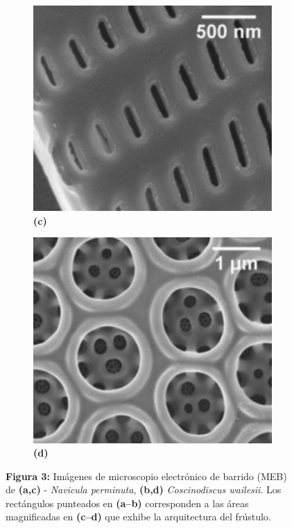 \documentclass[10pt,aspectratio=1610,compress,dvipsnames]{beamer}
\begin{document}
\begin{frame}
{\begin{figure}
  \begin{subfigure}[b]{0.2\linewidth}
    \includegraphics[width=0.9\linewidth]{Frustrulespictures/Screen Shot 2023-07-02 at 8.25.17 PM.png} %
    \caption*{\textbf{(c)}}
    \label{fig7:c}
  \end{subfigure}\hspace{0.5cm} %
  \begin{subfigure}[b]{0.2\linewidth}
    \includegraphics[width=0.9\linewidth]{Frustrulespictures/Screen Shot 2023-07-02 at 8.25.43 PM.png} %
    \caption*{\textbf{(d)}}
    \label{fig7:d}
  \end{subfigure}
  \captionsetup{labelformat=empty}
  \caption{\textbf{Figura 3:}
Imágenes de microscopio electrónico de barrido (MEB) de \textbf{(a,c)} - \emph{Navicula perminuta}, \textbf{(b,d)} \emph{Coscinodiscus wailesii}. Los rectángulos punteados en \textbf{(a–b)} corresponden a las áreas magnificadas en \textbf{(c–d)} que exhibe la arquitectura del frústulo. }
  \label{poresfrustrules}
  


\end{figure}}
\end{frame}
\end{document}
